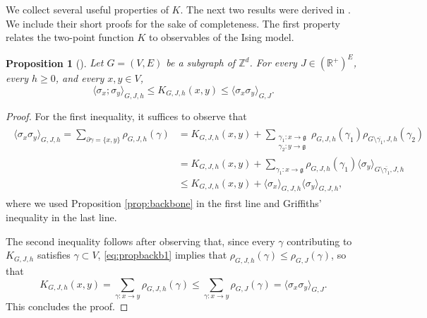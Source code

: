 \documentclass[10pt,a4paper]{amsart}
\numberwithin{equation}{section}
\newtheorem{Prop}[Thm]{Proposition}
\begin{document}
We collect several useful properties of $K$. The next two results were derived in \cite{AizenmanFernandezCriticalBehaviorMagnetization1986}. We include their short proofs for the sake of completeness. The first property relates the two-point function $K$ to observables of the Ising model.
\begin{Prop}[{\hspace{1pt}\cite[Proposition~4.7]{AizenmanFernandezCriticalBehaviorMagnetization1986}}]\label{prop:trunc vs K vs untrunc} Let $G=(V,E)$ be a subgraph of $\mathbb Z^d$. For every $J\in (\mathbb R^+)^E$, every $h\geq 0$, and every $x,y\in V$,\begin{equation}
	\langle \sigma_x;\sigma_y\rangle_{G,J,h}\leq K_{G,J,h}(x,y)\leq \langle \sigma_x\sigma_y\rangle_{G,J}.
\end{equation}
\end{Prop}
\begin{proof} For the first inequality, it suffices to observe that
\begin{align}
\begin{aligned}
	\langle \sigma_x\sigma_y\rangle_{G,J,h}=\sum_{\partial\gamma=\{x,y\}}\rho_{G,J,h}(\gamma)&=K_{G,J,h}(x,y)+\sum_{\substack{\gamma_1:x\rightarrow \mathfrak{g}\\\gamma_2:y\rightarrow \mathfrak{g}}}\rho_{G,J,h}(\gamma_1)\rho_{G\setminus\overline{\gamma_1},J,h}(\gamma_2)
	\\&=K_{G,J,h}(x,y)+\sum_{\gamma_1:x\rightarrow\mathfrak{g}}\rho_{G,J,h}(\gamma_1)\langle \sigma_y\rangle_{G\setminus\overline{\gamma_1},J,h}
	\\&\leq K_{G,J,h}(x,y)+\langle \sigma_x\rangle_{G,J,h}\langle \sigma_y\rangle_{G,J,h},
	\end{aligned}
\end{align}
where we used Proposition \ref{prop:backbone} in the first line and Griffiths' inequality in the last line. 

 The second inequality follows after observing that, since every $\gamma$ contributing to $K_{G,J,h}$ satisfies $\gamma\subset V$, \eqref{eq:propbackb1} implies that
	$\rho_{G,J,h}(\gamma)\leq \rho_{G,J}(\gamma)$, so that
	\begin{equation}
		K_{G,J,h}(x,y)=\sum_{\gamma:x\rightarrow y}\rho_{G,J,h}(\gamma)\leq \sum_{\gamma: x\rightarrow y}\rho_{G,J}(\gamma)=\langle \sigma_x\sigma_y\rangle_{G,J}.
	\end{equation}
This concludes the proof.
\end{proof}
\end{document}

